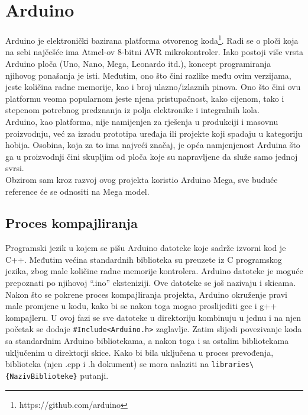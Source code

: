 \documentclass[../Document.tex]{subfiles}
\begin{document}
\section{Arduino}
Arduino je elektronički bazirana platforma otvorenog koda\footnote{https://github.com/arduino}. Radi se o ploči koja na sebi najčešće ima Atmel-ov 8-bitni AVR mikrokontroler. Iako postoji više vrsta Arduino ploča (Uno, Nano, Mega, Leonardo itd.), koncept programiranja njihovog ponašanja je isti. Međutim, ono što čini razlike među ovim verzijama, jeste količina radne memorije, kao i broj ulazno/izlaznih pinova. Ono što čini ovu platformu veoma popularnom jeste njena pristupačnost, kako cijenom, tako i stepenom potrebnog predznanja iz polja elektronike i integralnih kola.\\

Arduino, kao platforma, nije namijenjen za rješenja u produkciji i masovnu proizvodnju, već za izradu prototipa uređaja ili projekte koji spadaju u kategoriju hobija. Osobina, koja za to ima najveći značaj, je opća namjenjenost Arduina što ga u proizvodnji čini skupljim od ploča koje su napravljene da služe samo jednoj svrsi.\\

\noindent Obzirom sam kroz razvoj ovog projekta koristio Arduino Mega, sve buduće reference će se odnositi na Mega model.

\subsection{Proces kompajliranja}\label{kompajliranje}
Programski jezik u kojem se pišu Arduino datoteke koje sadrže izvorni kod je C++. Međutim većina standardnih biblioteka su preuzete iz C programskog jezika, zbog male količine radne memorije kontrolera. Arduino datoteke je moguće prepoznati po njihovoj ``.ino'' eksteniziji. Ove datoteke se još nazivaju i skicama.\\

Nakon što se pokrene proces kompajliranja projekta, Arduino okruženje pravi male promjene u kodu, kako bi se nakon toga mogao proslijediti gcc i g++ kompajleru. U ovoj fazi se sve datoteke u direktoriju kombinuju u jednu i na njen početak se dodaje \verb|#Include<Arduino.h>| zaglavlje. Zatim slijedi povezivanje koda sa standardnim Arduino bibliotekama, a nakon toga i sa ostalim bibliotekama uključenim u direktorji skice. Kako bi bila uključena u proces prevođenja, biblioteka (njen .cpp i .h dokument) se mora nalaziti na \verb|libraries\{NazivBiblioteke}| putanji.\\
\end{document}
